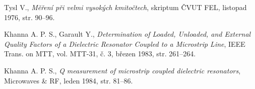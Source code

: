 \documentclass[11pt,a4paper]{article}
\begin{document}
\begin{thebibliography}{3}
     Tysl V., \emph{Měření při velmi vysokých kmitočtech}, skriptum ČVUT FEL, listopad 1976, str. 90--96.
    
     Khanna A. P. S., Garault Y., \emph{Determination of Loaded, Unloaded, and External Quality Factors of a Dielectric Resonator Coupled to a Microstrip Line}, IEEE Trans. on MTT, vol. MTT-31, č. 3, březen 1983, str. 261--264.
    
     Khanna A. P. S., \emph{Q measurement of microstrip coupled dielectric resonators}, Microwaves \& RF, leden 1984, str. 81--86.
\end{thebibliography}
\end{document}
